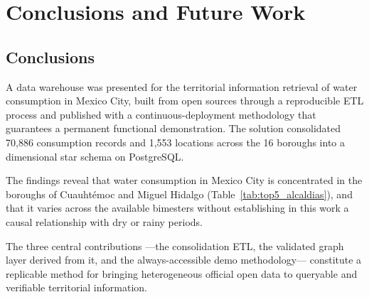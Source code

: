 \documentclass[runningheads]{llncs}
\newif\ifmarcarcambios
\newcommand{\icokg}[1]{\ifmarcarcambios\textcolor{nuevo}{#1}\else#1\fi}
\renewcommand{\_}{\origunderscore\allowbreak}
\begin{document}
\section{Conclusions and Future Work}
\label{sec:con}

\subsection{Conclusions}

A data warehouse was presented for the territorial information retrieval of water consumption in Mexico City, built from open sources through a reproducible ETL process and published with a continuous-deployment methodology that guarantees a permanent functional demonstration. The solution consolidated 70,886 consumption records and 1,553 locations across the 16 boroughs into a dimensional star schema on PostgreSQL.

The findings reveal that water consumption in Mexico City is concentrated in the boroughs of Cuauht\'emoc and Miguel Hidalgo (Table~\ref{tab:top5_alcaldias}), and that it varies across the available bimesters without establishing in this work a causal relationship with dry or rainy periods.

\icokg{The three central contributions ---the consolidation ETL, the validated graph layer derived from it, and the always-accessible demo methodology--- constitute} a replicable method for bringing heterogeneous official open data to queryable and verifiable territorial information.
\end{document}
